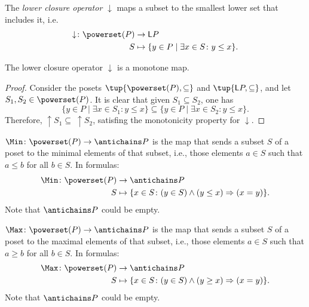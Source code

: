 \begin{definition}
The \emph{lower closure operator} $\downarrow$ maps a subset to the smallest lower set that includes it, i.e.
\begin{equation}
    \begin{aligned}
    \downarrow\colon \powerset(P)&\to \mathsf{L}P\\
    S&\mapsto \{ y\in P \mid \exists x\in S \colon y\leq x\}.
    \end{aligned}
\end{equation}
\end{definition}

\begin{lemma}
The lower closure operator $\downarrow$ is a monotone map.
\end{lemma}
\begin{proof}
Consider the posets $\tup{\powerset(P),\subseteq}$ and $\tup{\mathsf{L}P,\subseteq}$, and let $S_1,S_2\in \powerset(P)$. It is clear that given $S_1\subseteq S_2$, one has
\begin{equation}
    \{y\in P\mid \exists x\in S_1\colon y\leq x\} \subseteq \{y\in P\mid \exists x\in S_2\colon y\leq x\}.
\end{equation}
Therefore, $\uparrow S_1\subseteq \ \uparrow S_2$, satisfing the monotonicity property for $\downarrow$.
\end{proof}

\begin{definition}[Min]
\label{def:Min}
$\Min \colon \powerset(P) \to \antichains P$ is the map that sends a subset $S$ of a poset to the minimal elements of that subset, i.e., those elements $a \in S$ such that $a \leq b$ for all $b \in S$. In formulas:
\begin{equation}
    \begin{aligned}
    \Min \colon \powerset(P) &\to \antichains P\\
    S&\mapsto \{ x\in S\colon (y\in S)\wedge(y\leq x)\Rightarrow (x=y)\}.
    \end{aligned}
\end{equation}
Note that $\antichains P$ could be empty.
\end{definition}

\begin{definition}[Max]
\label{def:Max}
$\Max \colon \powerset(P) \to \antichains P$ is the map that sends a subset $S$ of a poset to the maximal elements of that subset, i.e., those elements $a \in S$ such that $a \geq b$ for all $b \in S$. In formulas:
\begin{equation}
    \begin{aligned}
    \Max \colon \powerset(P) &\to \antichains P\\
    S&\mapsto \{ x\in S\colon (y\in S)\wedge(y\geq x)\Rightarrow (x=y)\}.
    \end{aligned}
\end{equation}
Note that $\antichains P$ could be empty.
\end{definition}


